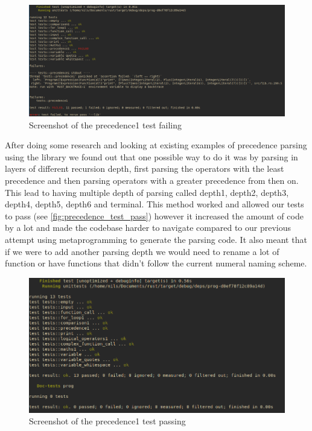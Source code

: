 \documentclass{article}
\begin{document}
\begin{figure}
	\includegraphics[width=\textwidth]{precedence_test_fail}
	\caption{Screenshot of the precedence1 test failing}
	\label{fig:precedence_test_fail}
\end{figure}

After doing some research and looking at existing examples of precedence
parsing using the  library we found out that one possible way to
do it was by parsing in layers of different recursion depth, first parsing the
operators with the least precedence and then parsing operators with a greater
precedence from then on. This lead to having multiple depth of parsing called
depth1, depth2, depth3, depth4, depth5, depth6 and terminal. This method worked
and allowed our tests to pass (see \autoref{fig:precedence_test_pass}) however
it increased the amount of code by a lot and made the codebase harder to
navigate compared to our previous attempt using metaprogramming to generate the
parsing code. It also meant that if we were to add another parsing depth we
would need to rename a lot of function or have functions that didn't follow the
current numeral naming scheme.

\begin{figure}
	\includegraphics[width=\textwidth]{precedence_test_pass}
	\caption{Screenshot of the precedence1 test passing}
	\label{fig:precedence_test_pass}
\end{figure}
\end{document}
